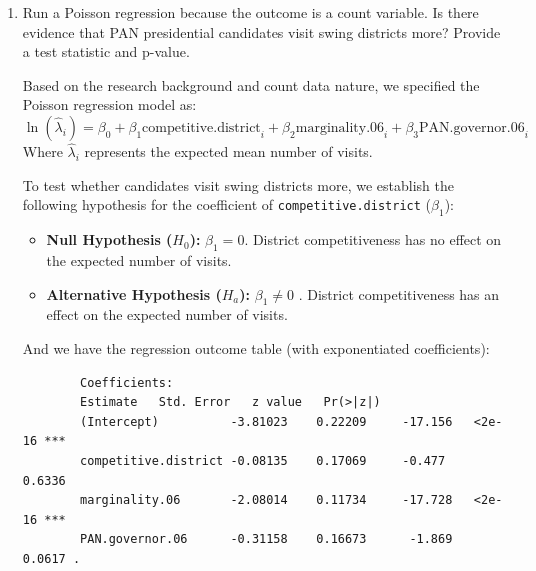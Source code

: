 \documentclass[12pt,letterpaper]{article}
\begin{document}
\begin{enumerate}
	\item [(a)]
	Run a Poisson regression because the outcome is a count variable. Is there evidence that PAN presidential candidates visit swing districts more? Provide a test statistic and p-value.
	
	\vspace{0.4cm} 
	
	 
	
	\medskip 
	
	Based on the research background and count data nature, we specified the Poisson regression model as:
	\[
	\ln(\hat{\lambda}_i) = \beta_0 + \beta_1 \text{competitive.district}_i + \beta_2 \text{marginality.06}_i + \beta_3 \text{PAN.governor.06}_i
	\]
	Where $\hat{\lambda}_i$ represents the expected mean number of visits.
	
	To test whether candidates visit swing districts more, we establish the following hypothesis for the coefficient of \texttt{competitive.district} ($\beta_1$):
	\begin{itemize}
		\item \textbf{Null Hypothesis ($H_0$):} $\beta_1 = 0$. District competitiveness has no effect on the expected number of visits.
		\item \textbf{Alternative Hypothesis ($H_a$):} $\beta_1 \neq 0$ . District competitiveness has an effect on the expected number of visits.
	\end{itemize}
	
	\medskip
	And we have the regression outcome table (with exponentiated coefficients):
	
	\vspace{0.2cm}
	\begin{verbatim}
		Coefficients:
		Estimate   Std. Error   z value   Pr(>|z|)    
		(Intercept)          -3.81023    0.22209     -17.156   <2e-16 ***
		competitive.district -0.08135    0.17069     -0.477    0.6336    
		marginality.06       -2.08014    0.11734     -17.728   <2e-16 ***
		PAN.governor.06      -0.31158    0.16673      -1.869   0.0617 .
	\end{verbatim}
	

\end{enumerate}
\end{document}
